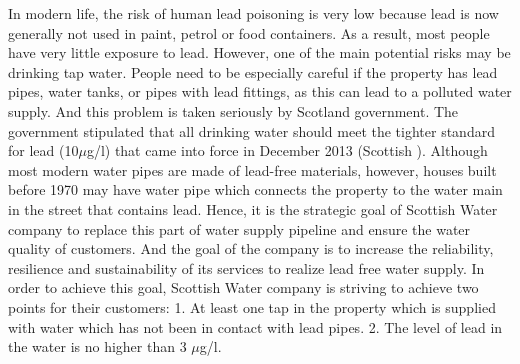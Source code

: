 \documentclass[11pt,twoside]{article}
\numberwithin{Theorem}{section}
\numberwithin{Definition}{section}
\numberwithin{Lemma}{section}
\numberwithin{Algorithm}{section}
\numberwithin{equation}{section}
\begin{document}
In modern life, the risk of human lead poisoning is very low because lead is now generally not used in paint, petrol or food containers. As a result, most people have very little exposure to lead. However, one of the main potential risks may be drinking tap water. People need to be especially careful if the property has lead pipes, water tanks, or pipes with lead fittings, as this can lead to a polluted water supply. And this problem is taken seriously by Scotland government. The government stipulated that all drinking water should meet the tighter standard for lead (10$\mu$g/l) that came into force in December 2013 (Scottish \citeauthor{government}).  Although most modern water pipes are made of lead-free materials, however, houses built before 1970 may have water pipe which connects the property to the water main in the street that contains lead. Hence, it is the strategic goal of Scottish Water company to replace this part of water supply pipeline and ensure the water quality of customers. And the goal of the company is to increase the reliability, resilience and sustainability of its services to realize lead free water supply. In order to achieve this goal, Scottish Water company is striving to achieve two points for their customers: 1. At least one tap in the property which is supplied with water which has not been in contact with lead pipes. 2. The level of lead in the water is no higher than 3 $\mu$g/l.

\clearpage
\end{document}
